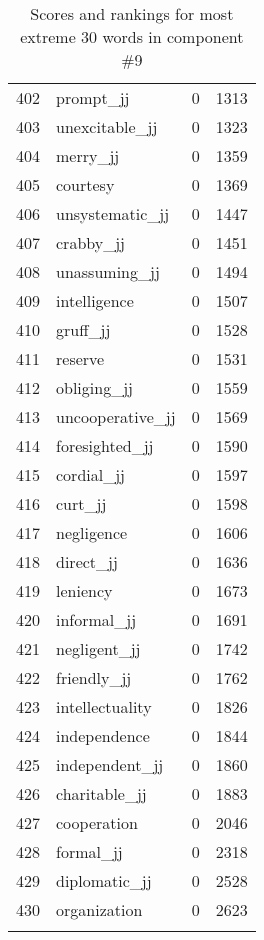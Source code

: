 \begin{longtable}[!htbp]{| rlr@{.}l |}
    402 & prompt\_jj & 0 & 1313 \\
    403 & unexcitable\_jj & 0 & 1323 \\
    404 & merry\_jj & 0 & 1359 \\
    405 & courtesy & 0 & 1369 \\
    406 & unsystematic\_jj & 0 & 1447 \\
    407 & crabby\_jj & 0 & 1451 \\
    408 & unassuming\_jj & 0 & 1494 \\
    409 & intelligence & 0 & 1507 \\
    410 & gruff\_jj & 0 & 1528 \\
    411 & reserve & 0 & 1531 \\
    412 & obliging\_jj & 0 & 1559 \\
    413 & uncooperative\_jj & 0 & 1569 \\
    414 & foresighted\_jj & 0 & 1590 \\
    415 & cordial\_jj & 0 & 1597 \\
    416 & curt\_jj & 0 & 1598 \\
    417 & negligence & 0 & 1606 \\
    418 & direct\_jj & 0 & 1636 \\
    419 & leniency & 0 & 1673 \\
    420 & informal\_jj & 0 & 1691 \\
    421 & negligent\_jj & 0 & 1742 \\
    422 & friendly\_jj & 0 & 1762 \\
    423 & intellectuality & 0 & 1826 \\
    424 & independence & 0 & 1844 \\
    425 & independent\_jj & 0 & 1860 \\
    426 & charitable\_jj & 0 & 1883 \\
    427 & cooperation & 0 & 2046 \\
    428 & formal\_jj & 0 & 2318 \\
    429 & diplomatic\_jj & 0 & 2528 \\
    430 & organization & 0 & 2623 \\
    \hline
    \caption{Scores and rankings for most extreme 30 words in component \#9} \\
\end{longtable}
